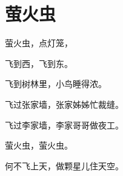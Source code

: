 \documentclass[12pt,UTF-8,openany]{ctexbook}
\begin{document}
\clearpage

\begin{center}
    
\end{center}


\hanzibox{}\hanzibox{}\hanzibox{}\hanzibox{}\hspace{1em}\hanzibox{}\hanzibox{}\hanzibox{}\hanzibox{}

\hanzibox{}\hanzibox{}\hanzibox{}\hanzibox{}\hspace{1em}\hanzibox{}\hanzibox{}\hanzibox{}\hanzibox{}

\hanzibox{}\hanzibox{}\hanzibox{}\hanzibox{}\hspace{1em}\hanzibox{}\hanzibox{}\hanzibox{}\hanzibox{}






\chapter{萤火虫}

\begin{large}
    
    萤火虫，点灯笼，
    
    飞到西，飞到东。
    
    飞到树林里，小鸟睡得浓。
    
    飞过张家墙，张家姊姊忙裁缝。
    
    飞过李家墙，李家哥哥做夜工。
    
    萤火虫，萤火虫。
    
    何不飞上天，做颗星儿住天空。
    
\end{large}


\clearpage

\begin{center}
    
\end{center}


\hanzibox{}\hanzibox{}\hanzibox{}\hanzibox{}\hspace{1em}\hanzibox{}\hanzibox{}\hanzibox{}\hanzibox{}

\hanzibox{}\hanzibox{}\hanzibox{}\hanzibox{}\hspace{1em}\hanzibox{}\hanzibox{}\hanzibox{}\hanzibox{}
\end{document}
